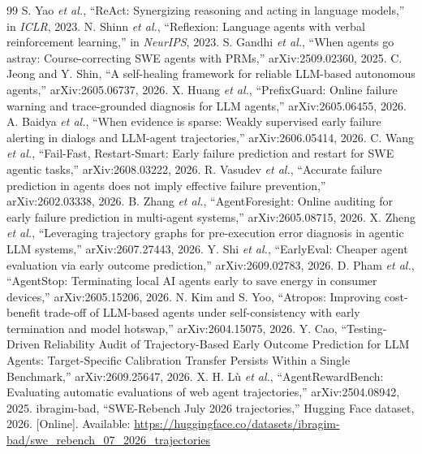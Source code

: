 \documentclass[conference]{IEEEtran}
\begin{document}
\begin{thebibliography}{99}
 S. Yao \emph{et al.}, ``ReAct: Synergizing reasoning and acting in language models,'' in \emph{ICLR}, 2023.
 N. Shinn \emph{et al.}, ``Reflexion: Language agents with verbal reinforcement learning,'' in \emph{NeurIPS}, 2023.
 S. Gandhi \emph{et al.}, ``When agents go astray: Course-correcting SWE agents with PRMs,'' arXiv:2509.02360, 2025.
 C. Jeong and Y. Shin, ``A self-healing framework for reliable LLM-based autonomous agents,'' arXiv:2605.06737, 2026.
 X. Huang \emph{et al.}, ``PrefixGuard: Online failure warning and trace-grounded diagnosis for LLM agents,'' arXiv:2605.06455, 2026.
 A. Baidya \emph{et al.}, ``When evidence is sparse: Weakly supervised early failure alerting in dialogs and LLM-agent trajectories,'' arXiv:2606.05414, 2026.
 C. Wang \emph{et al.}, ``Fail-Fast, Restart-Smart: Early failure prediction and restart for SWE agentic tasks,'' arXiv:2608.03222, 2026.
 R. Vasudev \emph{et al.}, ``Accurate failure prediction in agents does not imply effective failure prevention,'' arXiv:2602.03338, 2026.
 B. Zhang \emph{et al.}, ``AgentForesight: Online auditing for early failure prediction in multi-agent systems,'' arXiv:2605.08715, 2026.
 X. Zheng \emph{et al.}, ``Leveraging trajectory graphs for pre-execution error diagnosis in agentic LLM systems,'' arXiv:2607.27443, 2026.
 Y. Shi \emph{et al.}, ``EarlyEval: Cheaper agent evaluation via early outcome prediction,'' arXiv:2609.02783, 2026.
 D. Pham \emph{et al.}, ``AgentStop: Terminating local AI agents early to save energy in consumer devices,'' arXiv:2605.15206, 2026.
 N. Kim and S. Yoo, ``Atropos: Improving cost-benefit trade-off of LLM-based agents under self-consistency with early termination and model hotswap,'' arXiv:2604.15075, 2026.
 Y. Cao, ``Testing-Driven Reliability Audit of Trajectory-Based Early Outcome Prediction for LLM Agents: Target-Specific Calibration Transfer Persists Within a Single Benchmark,'' arXiv:2609.25647, 2026.
 X. H. L\`u \emph{et al.}, ``AgentRewardBench: Evaluating automatic evaluations of web agent trajectories,'' arXiv:2504.08942, 2025.
 ibragim-bad, ``SWE-Rebench July 2026 trajectories,'' Hugging Face dataset, 2026. [Online]. Available: \url{https://huggingface.co/datasets/ibragim-bad/swe_rebench_07_2026_trajectories}

\end{thebibliography}
\end{document}
